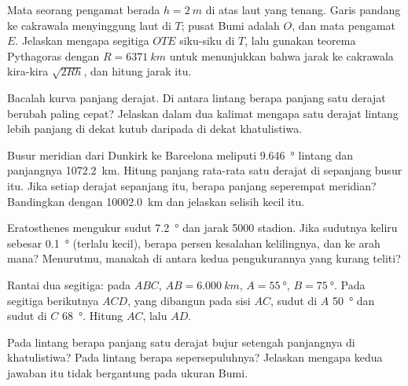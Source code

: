 \begin{exercise}[$\star\star$]\label{exo:g10:measuring-the-earth:9}
Mata seorang pengamat berada $h = \qty{2}{m}$ di atas laut yang tenang. Garis
pandang ke cakrawala menyinggung laut di $T$; pusat Bumi adalah $O$, dan mata
pengamat $E$. Jelaskan mengapa segitiga $OTE$ siku-siku di $T$, lalu gunakan
teorema Pythagoras dengan $R = \qty{6371}{km}$ untuk menunjukkan bahwa jarak
ke cakrawala kira-kira $\sqrt{2Rh}$, dan hitung jarak itu.
\end{exercise}

\begin{exercise}[$\star\star$]\label{exo:g10:measuring-the-earth:10}
Bacalah kurva panjang derajat. Di antara lintang berapa panjang satu derajat
berubah paling cepat? Jelaskan dalam dua kalimat mengapa satu derajat lintang
lebih panjang di dekat kutub daripada di dekat khatulistiwa.
\end{exercise}

\begin{exercise}[$\star\star$]\label{exo:g10:measuring-the-earth:11}
Busur meridian dari Dunkirk ke Barcelona meliputi \qty{9.646}{\degree}
lintang dan panjangnya \qty{1072.2}{km}. Hitung panjang rata-rata satu derajat
di sepanjang busur itu. Jika setiap derajat sepanjang itu, berapa panjang
seperempat meridian? Bandingkan dengan \qty{10002.0}{km} dan jelaskan selisih
kecil itu.
\end{exercise}

\begin{exercise}[$\star\star\star$]\label{exo:g10:measuring-the-earth:12}
Eratosthenes mengukur sudut \qty{7.2}{\degree} dan jarak 5000 stadion. Jika
sudutnya keliru sebesar \qty{0.1}{\degree} (terlalu kecil), berapa persen
kesalahan kelilingnya, dan ke arah mana? Menurutmu, manakah di antara kedua
pengukurannya yang kurang teliti?
\end{exercise}

\begin{exercise}[$\star\star\star$]\label{exo:g10:measuring-the-earth:13}
Rantai dua segitiga: pada $ABC$, $AB = \qty{6.000}{km}$,
$A = \qty{55}{\degree}$, $B = \qty{75}{\degree}$. Pada segitiga berikutnya
$ACD$, yang dibangun pada sisi $AC$, sudut di $A$ \qty{50}{\degree} dan sudut
di $C$ \qty{68}{\degree}. Hitung $AC$, lalu $AD$.
\end{exercise}

\begin{exercise}[$\star\star\star$]\label{exo:g10:measuring-the-earth:14}
Pada lintang berapa panjang satu derajat bujur setengah panjangnya di
khatulistiwa? Pada lintang berapa sepersepuluhnya? Jelaskan mengapa kedua
jawaban itu tidak bergantung pada ukuran Bumi.
\end{exercise}

